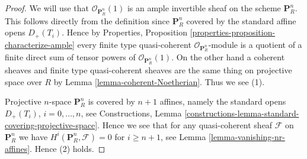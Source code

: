 \begin{proof}
We will use that $\mathcal{O}_{\mathbf{P}^n_R}(1)$ is an ample invertible
sheaf on
the scheme $\mathbf{P}^n_R$. This follows directly from the definition
since $\mathbf{P}^n_R$ covered by the standard affine opens $D_{+}(T_i)$.
Hence by
Properties, Proposition \ref{properties-proposition-characterize-ample}
every finite type quasi-coherent $\mathcal{O}_{\mathbf{P}^n_R}$-module
is a quotient of a finite direct sum of tensor powers of
$\mathcal{O}_{\mathbf{P}^n_R}(1)$. On the other hand a coherent sheaves
and finite type quasi-coherent sheaves are the same thing on projective
space over $R$ by Lemma \ref{lemma-coherent-Noetherian}. Thus we see (1).

\medskip\noindent
Projective $n$-space $\mathbf{P}^n_R$ is covered by $n + 1$ affines,
namely the standard opens $D_{+}(T_i)$, $i = 0, \ldots, n$, see Constructions,
Lemma \ref{constructions-lemma-standard-covering-projective-space}.
Hence we see that for any quasi-coherent
sheaf $\mathcal{F}$ on $\mathbf{P}^n_R$
we have $H^i(\mathbf{P}^n_R, \mathcal{F}) = 0$ for $i \geq n + 1$,
see Lemma \ref{lemma-vanishing-nr-affines}. Hence (2) holds.


\end{proof}
